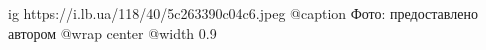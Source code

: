  
 
 
 
 

\ifcmt
  ig https://i.lb.ua/118/40/5c263390c04c6.jpeg
	@caption Фото: предоставлено автором
  @wrap center
  @width 0.9
\fi
